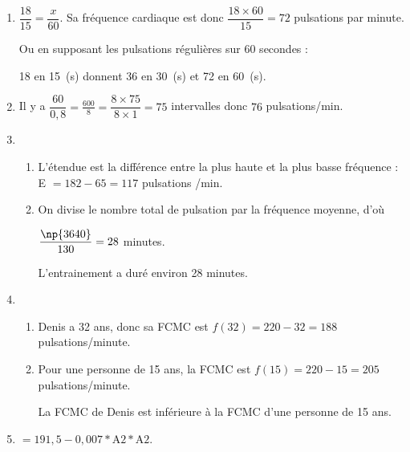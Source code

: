 
\medskip

\begin{enumerate}
\item $\dfrac{18}{15} = \dfrac{x}{60}$. Sa fréquence cardiaque est donc  $\dfrac{18 \times 60}{15} = 72$ pulsations par minute.

Ou en supposant les pulsations régulières sur 60 secondes :

18 en 15~(s) donnent 36 en 30~(s) et 72 en 60~(s).
\item Il y a $\dfrac{60}{0,8} = \frac{600}{8} = \dfrac{8 \times 75}{8 \times 1} =  75$ intervalles donc $76$ pulsations/min.
\item 
	\begin{enumerate}
		\item L'étendue est la différence entre la plus haute et la plus basse fréquence : E $= 182 - 65 = 117$ pulsations /min.
		\item On divise le nombre total de pulsation par la fréquence moyenne, d'où
		
$\dfrac{\np{3640}}{130} = 28$ minutes.
		
L'entrainement a duré environ 28 minutes.
	\end{enumerate}		
\item
	\begin{enumerate} 
		\item Denis a 32 ans, donc sa FCMC est $f(32) = 220 - 32 = 188$ pulsations/minute.
		\item Pour une personne de 15 ans, la FCMC est $f(15) = 220 - 15 = 205$ pulsations/minute.

La FCMC de Denis est inférieure à la FCMC d'une personne de 15 ans.
	\end{enumerate}
\item $=191,5 - 0,007*\text{A}2*\text{A}2$.
\end{enumerate}

\vspace{0,5cm}


